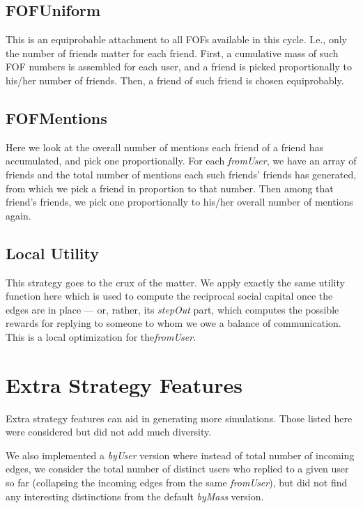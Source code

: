 \documentclass[10pt,oneside]{memoir}
\begin{document}
\subsection{FOFUniform}
\label{fofuniform}

This is an equiprobable attachment to all FOFs available in this cycle.  I.e., only the number of friends matter for each friend.  First, a cumulative mass of such FOF numbers is assembled for each user, and a friend is picked proportionally to his/her number of friends.  Then, a friend of such friend is chosen equiprobably.


\subsection{FOFMentions}
\label{fofmentions}

Here we look at the overall number of mentions each friend of a friend has accumulated, and pick one proportionally.  For each \emph{fromUser}, we have an array of friends and the total number of mentions each such friends' friends has generated, from which we pick a friend in proportion to that number.  Then among that friend's friends, we pick one proportionally to his/her overall number of mentions again.


\subsection{Local Utility}
\label{localutility}

This strategy goes to the crux of the matter.  We apply exactly the same utility function here which is used to compute the reciprocal social capital once the edges are in place --- or, rather, its \emph{stepOut} part, which computes the possible rewards for replying to someone to whom we owe a balance of communication.  This is a local optimization for the\emph{fromUser}. 


\section{Extra Strategy Features}
\label{extrastrategyfeatures}

Extra strategy features can aid in generating more simulations.  Those listed here were considered but did not add much diversity.


We also implemented a \emph{byUser} version where instead of total number of incoming edges, we consider the total number of distinct users who replied to a given user so far (collapsing the incoming edges from the same \emph{fromUser}), but did not find any interesting distinctions from the default \emph{byMass} version.
\end{document}
